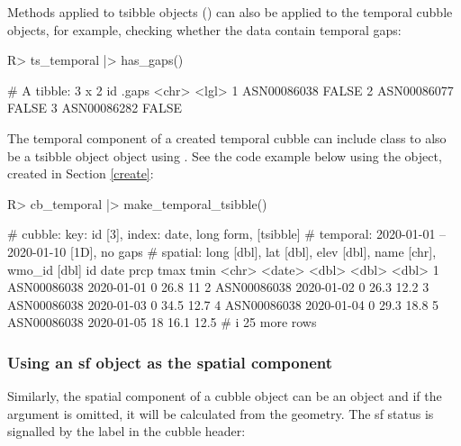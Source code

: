 \documentclass[
  shortnames]{jss}
\begin{document}
Methods applied to tsibble objects () can also be applied to the temporal cubble objects, for example, checking whether the data contain temporal gaps:

\begin{CodeChunk}
\begin{CodeInput}
R> ts_temporal |> has_gaps()
\end{CodeInput}
\begin{CodeOutput}
# A tibble: 3 x 2
  id          .gaps
  <chr>       <lgl>
1 ASN00086038 FALSE
2 ASN00086077 FALSE
3 ASN00086282 FALSE
\end{CodeOutput}
\end{CodeChunk}

The temporal component of a created temporal cubble can include class  to also be a tsibble object  object using . See the code example below using the  object, created in Section \ref{create}:

\begin{CodeChunk}
\begin{CodeInput}
R> cb_temporal |> make_temporal_tsibble() 
\end{CodeInput}
\begin{CodeOutput}
# cubble:   key: id [3], index: date, long form, [tsibble]
# temporal: 2020-01-01 -- 2020-01-10 [1D], no gaps
# spatial:  long [dbl], lat [dbl], elev [dbl], name [chr], wmo_id [dbl]
  id          date        prcp  tmax  tmin
  <chr>       <date>     <dbl> <dbl> <dbl>
1 ASN00086038 2020-01-01     0  26.8  11  
2 ASN00086038 2020-01-02     0  26.3  12.2
3 ASN00086038 2020-01-03     0  34.5  12.7
4 ASN00086038 2020-01-04     0  29.3  18.8
5 ASN00086038 2020-01-05    18  16.1  12.5
# i 25 more rows
\end{CodeOutput}
\end{CodeChunk}

\hypertarget{using-an-sf-object-as-the-spatial-component}{%
\subsubsection{Using an sf object as the spatial component}\label{using-an-sf-object-as-the-spatial-component}}

Similarly, the spatial component of a cubble object can be an  object and if the  argument is omitted, it will be calculated from the  geometry. The sf status is signalled by the \code{[sf]} label in the cubble header:
\end{document}
